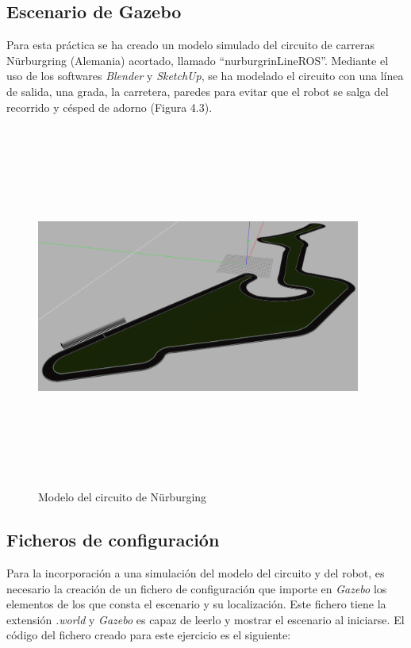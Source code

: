 \subsection{Escenario de Gazebo}
Para esta práctica se ha creado un modelo simulado del circuito de carreras Nürburgring (Alemania) acortado, llamado ``nurburgrinLineROS''. Mediante el uso de los softwares \textit{Blender} y \textit{SketchUp}, se ha modelado el circuito con una línea de salida, una grada, la carretera, paredes para evitar que el robot se salga del recorrido y césped de adorno (Figura 4.3).

\begin{figure}[H]
  \begin{center}
    \includegraphics[width=0.95\textwidth, height=12cm]{figures/circuito.png}
		\caption{Modelo del circuito de Nürburging}
		\label{fig.circuito}
		\end{center}
\end{figure} 

\subsection{Ficheros de configuración} \label{sec.fichconf}
Para la incorporación a una simulación del modelo del circuito y del robot, es necesario la creación de un fichero de configuración que importe en \textit{Gazebo} los elementos de los que consta el escenario y su localización. Este fichero tiene la extensión \textit{.world} y \textit{Gazebo} es capaz de leerlo y mostrar el escenario al iniciarse.
El código del fichero creado para este ejercicio es el siguiente:

